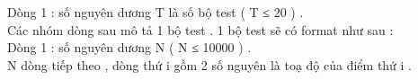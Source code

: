Dòng 1 : số nguyên dương T là số bộ test ( T ≤ 20 ) .   
\\   Các nhóm dòng sau mô tả 1 bộ test . 1 bộ test sẽ có format như sau :   
\\   Dòng 1 : số nguyên dương N (  N ≤ 10000 ) .   
\\   N dòng tiếp theo , dòng thứ i gồm 2 số nguyên là toạ độ của điểm thứ i .